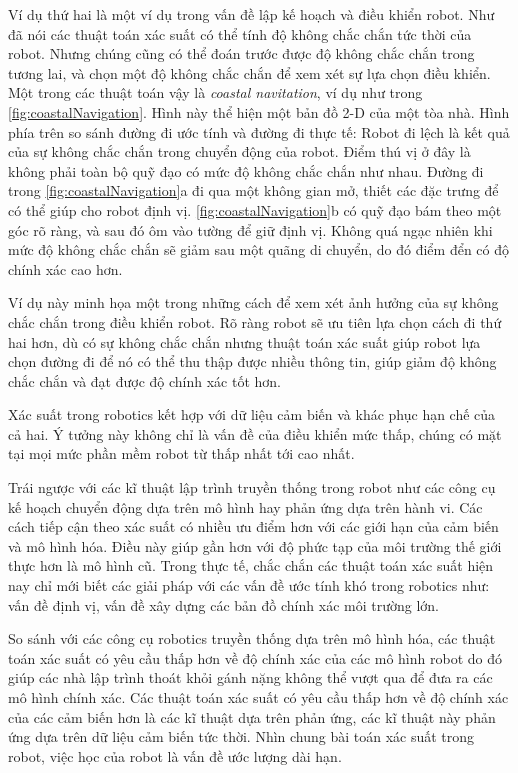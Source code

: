 Ví dụ thứ hai là một ví dụ trong vấn đề lập kế hoạch và điều khiển robot. Như đã nói các thuật toán xác suất có thể tính độ không chắc chắn tức thời của robot. Nhưng chúng cũng có thể đoán trước được độ không chắc chắn trong tương lai, và chọn một độ không chắc chắn để xem xét sự lựa chọn điều khiển. Một trong các thuật toán vậy là \textit{coastal navitation}, ví dụ như trong \figurename{\ref{fig:coastalNavigation}}. Hình này thể hiện một bản đồ 2-D của một tòa nhà. Hình phía trên so sánh đường đi ước tính và đường đi thực tế: Robot đi lệch là kết quả của sự không chắc chắn trong chuyển động của robot. Điểm thú vị ở đây là không phải toàn bộ quỹ đạo có mức độ không chắc chắn như nhau. Đường đi trong \figurename{\ref{fig:coastalNavigation}}a đi qua một không gian mở, thiết các đặc trưng để có thể giúp cho robot định vị.  \figurename{\ref{fig:coastalNavigation}}b có quỹ đạo bám theo một góc rõ ràng, và sau đó ôm vào tường để giữ định vị. Không quá ngạc nhiên khi mức độ không chắc chắn sẽ giảm sau một quãng di chuyển, do đó điểm đển có độ chính xác cao hơn.

Ví dụ này minh họa một trong những cách để xem xét ảnh hưởng của sự không chắc chắn trong điều khiển robot. Rõ ràng robot sẽ ưu tiên lựa chọn cách đi thứ hai hơn, dù có sự không chắc chắn nhưng thuật toán xác suất giúp robot lựa chọn đường đi để nó có thể thu thập được nhiều thông tin, giúp giảm độ không chắc chắn và đạt được độ chính xác tốt hơn.

Xác suất trong robotics kết hợp với dữ liệu cảm biến và khác phục hạn chế của cả hai. Ý tưởng này không chỉ là vấn đề của điều khiển mức thấp, chúng có mặt tại mọi mức phần mềm robot từ thấp nhất tới cao nhất.

Trái ngược với các kĩ thuật lập trình truyền thống trong robot như các công cụ kế hoạch chuyển động dựa trên mô hình hay phản ứng dựa trên hành vi. Các cách tiếp cận theo xác suất có nhiều ưu điểm hơn với các giới hạn của cảm biến và mô hình hóa. Điều này giúp gần hơn với độ phức tạp của môi trường thế giới thực hơn là mô hình cũ. Trong thực tế, chắc chắn các thuật toán xác suất hiện nay chỉ mới biết các giải pháp với các vấn đề ước tính khó trong robotics như: vấn đề định vị, vấn đề xây dựng các bản đồ chính xác môi trường lớn.

So sánh với các công cụ robotics truyền thống dựa trên mô hình hóa, các thuật toán xác suất có yêu cầu thấp hơn về độ chính xác của các mô hình robot do đó giúp các nhà lập trình thoát khỏi gánh nặng không thể vượt qua để đưa ra các mô hình chính xác. Các thuật toán xác suất có yêu cầu thấp hơn về độ chính xác của các cảm biến hơn là các kĩ thuật dựa trên phản ứng, các kĩ thuật này phản ứng dựa trên dữ liệu cảm biến tức thời. Nhìn chung bài toán xác suất trong robot, việc học của robot là vấn đề ước lượng dài hạn.

